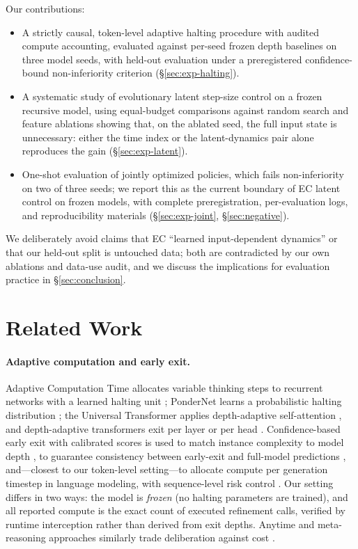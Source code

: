 \documentclass[11pt]{article}
\begin{document}
\noindent Our contributions:
\begin{itemize}
\item A strictly causal, token-level adaptive halting procedure with audited compute accounting, evaluated against per-seed frozen depth baselines on three model seeds, with held-out evaluation under a preregistered confidence-bound non-inferiority criterion (\S\ref{sec:exp-halting}).
\item A systematic study of evolutionary latent step-size control on a frozen recursive model, using equal-budget comparisons against random search and feature ablations showing that, on the ablated seed, the full input state is unnecessary: either the time index or the latent-dynamics pair alone reproduces the gain (\S\ref{sec:exp-latent}).
\item One-shot evaluation of jointly optimized policies, which fails non-inferiority on two of three seeds; we report this as the current boundary of EC latent control on frozen models, with complete preregistration, per-evaluation logs, and reproducibility materials (\S\ref{sec:exp-joint}, \S\ref{sec:negative}).
\end{itemize}

We deliberately avoid claims that EC ``learned input-dependent dynamics'' or that our held-out split is untouched data; both are contradicted by our own ablations and data-use audit, and we discuss the implications for evaluation practice in \S\ref{sec:conclusion}.

\section{Related Work}
\label{sec:related}

\paragraph{Adaptive computation and early exit.}
Adaptive Computation Time allocates variable thinking steps to recurrent networks with a learned halting unit \citep{graves2016adaptive}; PonderNet learns a probabilistic halting distribution \citep{banino2021ponder}; the Universal Transformer applies depth-adaptive self-attention \citep{dehghani2019universal}, and depth-adaptive transformers exit per layer or per head \citep{elbayad2020depth}. Confidence-based early exit with calibrated scores is used to match instance complexity to model depth \citep{schwartz2020right}, to guarantee consistency between early-exit and full-model predictions \citep{schuster2021cats}, and---closest to our token-level setting---to allocate compute per generation timestep in language modeling, with sequence-level risk control \citep{schuster2022calm}. Our setting differs in two ways: the model is \emph{frozen} (no halting parameters are trained), and all reported compute is the exact count of executed refinement calls, verified by runtime interception rather than derived from exit depths. Anytime and meta-reasoning approaches similarly trade deliberation against cost \citep{zilberstein1996anytime}.
\end{document}
